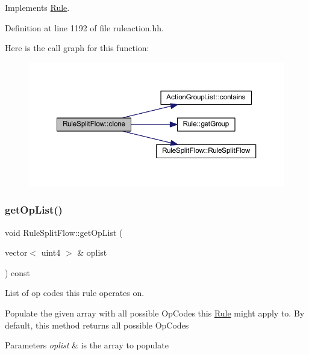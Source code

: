 Implements \mbox{\hyperlink{class_rule_a70de90a76461bfa7ea0b575ce3c11e4d}{Rule}}.



Definition at line 1192 of file ruleaction.\+hh.

Here is the call graph for this function\+:
\nopagebreak
\begin{figure}[H]
\begin{center}
\leavevmode
\includegraphics[width=350pt]{class_rule_split_flow_a2eb007bc2f4ef7c6c11c0bfb15896c7a_cgraph}
\end{center}
\end{figure}
\mbox{\label{class_rule_split_flow_adfc8fe9bd2e6a1aafed0a44605fd7fda}} 
\subsubsection{\texorpdfstring{getOpList()}{getOpList()}}
{\footnotesize\ttfamily void Rule\+Split\+Flow\+::get\+Op\+List (\begin{DoxyParamCaption}\item[{vector$<$ uint4 $>$ \&}]{oplist }\end{DoxyParamCaption}) const\hspace{0.3cm}{\ttfamily [virtual]}}



List of op codes this rule operates on. 

Populate the given array with all possible Op\+Codes this \mbox{\hyperlink{class_rule}{Rule}} might apply to. By default, this method returns all possible Op\+Codes 
\begin{DoxyParams}{Parameters}
{\em oplist} & is the array to populate \\
\hline
\end{DoxyParams}


